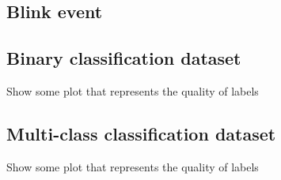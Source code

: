 \subsection{Blink event}



\subsection{Binary classification dataset}

Show some plot that represents the quality of labels

\subsection{Multi-class classification dataset}

Show some plot that represents the quality of labels